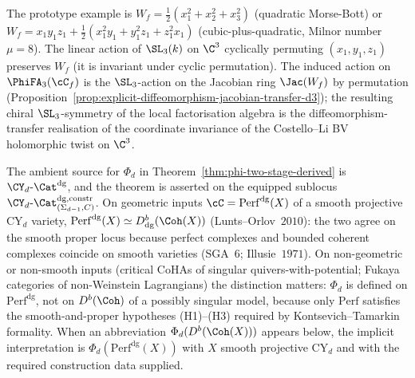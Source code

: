 \begin{remark}
\label{rem:c3-instance-morphism-functoriality}
The prototype example is $W_f = \tfrac{1}{2}(x_1^2 + x_2^2 + x_3^2)$
(quadratic Morse-Bott) or
$W_f = x_1 y_1 z_1 + \tfrac{1}{2}(x_1^2 y_1 + y_1^2 z_1 + z_1^2 x_1)$
(cubic-plus-quadratic, Milnor number $\mu = 8$). The linear action
of $\SL_3(k)$ on $\C^3$ cyclically permuting $(x_1, y_1, z_1)$
preserves $W_f$ (it is invariant under cyclic permutation). The
induced action on $\PhiFA_3(\cC_f)$ is the $\SL_3$-action on the
Jacobian ring $\Jac(W_f)$ by permutation (Proposition~\ref{prop:explicit-diffeomorphism-jacobian-transfer-d3});
the resulting chiral $\SL_3$-symmetry of the local factorisation
algebra is the diffeomorphism-transfer realisation of the coordinate
invariance of the Costello--Li BV holomorphic twist on $\C^3$.
\end{remark}

\begin{remark}
\label{rem:phi-d-factors-through-perf}
The ambient source for $\Phi_d$ in Theorem~\ref{thm:phi-two-stage-derived} is $\CY_d\text{-}\Cat^{\mathrm{dg}}$, and the theorem is asserted on the equipped sublocus $\CY_d\text{-}\Cat^{\mathrm{dg,constr}}_{(\Sigma_{d-1},C)}$. On geometric inputs $\cC = \mathrm{Perf}^{\mathrm{dg}}(X)$ of a smooth projective CY$_d$ variety, $\mathrm{Perf}^{\mathrm{dg}}(X) \simeq D^b_{\mathrm{dg}}(\Coh(X))$ (Lunts--Orlov~$2010$): the two agree on the smooth proper locus because perfect complexes and bounded coherent complexes coincide on smooth varieties (SGA~$6$; Illusie~$1971$). On non-geometric or non-smooth inputs (critical CoHAs of singular quivers-with-potential; Fukaya categories of non-Weinstein Lagrangians) the distinction matters: $\Phi_d$ is defined on $\mathrm{Perf}^{\mathrm{dg}}$, not on $D^b(\Coh)$ of a possibly singular model, because only $\mathrm{Perf}$ satisfies the smooth-and-proper hypotheses \textup{(H1)--(H3)} required by Kontsevich--Tamarkin formality. When an abbreviation $\Phi_d(D^b(\Coh(X)))$ appears below, the implicit interpretation is $\Phi_d(\mathrm{Perf}^{\mathrm{dg}}(X))$ with $X$ smooth projective CY$_d$ and with the required construction data supplied.
\end{remark}

